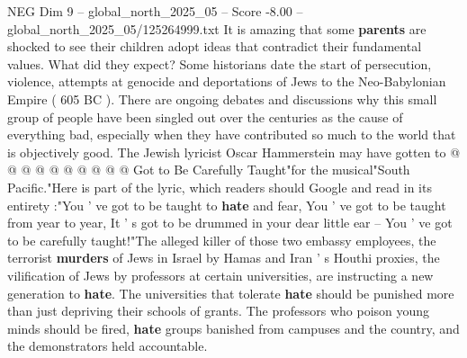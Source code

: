 \begin{textsample}{NEG Dim 9 – global\_north\_2025\_05 – Score -8.00 – global\_north\_2025\_05/125264999.txt}
It is amazing that some \textbf{parents} are shocked to see their children adopt ideas that contradict their fundamental values.
What did they expect?
Some historians date the start of persecution, violence, attempts at genocide and deportations of Jews to the Neo-Babylonian Empire ( 605 BC ).
There are ongoing debates and discussions why this small group of people have been singled out over the centuries as the cause of everything bad, especially when they have contributed so much to the world that is objectively good.
The Jewish lyricist Oscar Hammerstein may have gotten to @ @ @ @ @ @ @ @ @ @ Got to Be Carefully Taught"for the musical"South Pacific."Here is part of the lyric, which readers should Google and read in its entirety :"You ' ve got to be taught to \textbf{hate} and fear, You ' ve got to be taught from year to year, It ' s got to be drummed in your dear little ear -- You ' ve got to be carefully taught!"The alleged killer of those two embassy employees, the terrorist \textbf{murders} of Jews in Israel by Hamas and Iran ' s Houthi proxies, the vilification of Jews by professors at certain universities, are instructing a new generation to \textbf{hate}.
The universities that tolerate \textbf{hate} should be punished more than just depriving their schools of grants.
The professors who poison young minds should be fired, \textbf{hate} groups banished from campuses and the country, and the demonstrators held accountable.

\end{textsample}
